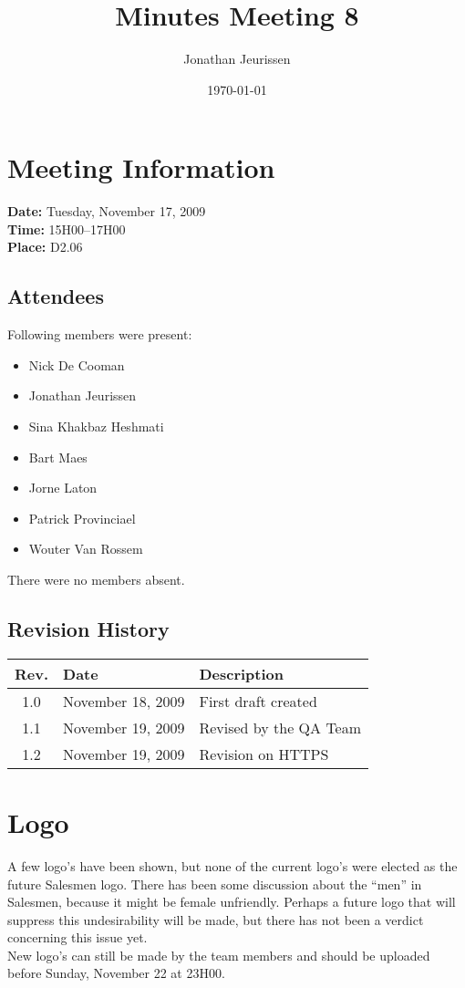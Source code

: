 \documentclass[a4paper, 12pt]{article}
\begin{document}
\title{Minutes Meeting 8}
\author{Jonathan Jeurissen}
\date{\today}

\maketitle	
	\section{Meeting Information}
		\textbf{Date:} Tuesday, November 17, 2009\\
		\textbf{Time:} 15H00--17H00\\
		\textbf{Place:} D2.06\\
		\subsection{Attendees}
Following members were present:
			\begin{itemize}
				\item Nick De Cooman
				\item Jonathan Jeurissen
				\item Sina Khakbaz Heshmati
				\item Bart Maes
				\item Jorne Laton
				\item Patrick Provinciael
				\item Wouter Van Rossem
			\end{itemize}
There were no members absent.
			
		\subsection{Revision History}
			\begin{tabular}{c | l | l }
				\textbf{Rev.} & \textbf{Date} & \textbf{Description} \\
				\hline
				1.0 & November 18, 2009 & First draft created \\
				1.1 & November 19, 2009 & Revised by the QA Team \\
				1.2 & November 19, 2009 & Revision on HTTPS \\
			\end{tabular}		

	\section{Logo}
A few logo's have been shown, but none of the current logo's were elected as the future Salesmen logo. There has been some discussion about the ``men'' in Salesmen, because it might be female unfriendly. Perhaps a future logo that will suppress this undesirability will be made, but there has not been a verdict concerning this issue yet. \\
New logo's can still be made by the team members and should be uploaded before Sunday, November 22 at 23H00.
\end{document}
